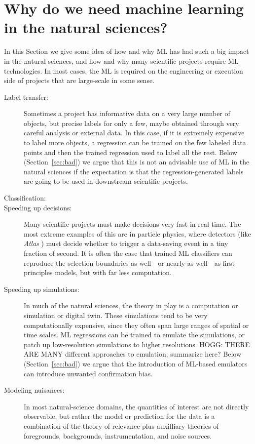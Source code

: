 \documentclass[11pt]{article}
\newcommand{\sectionname}{Section}
\begin{document}
\section{Why do we need machine learning in the natural sciences?}
In this \sectionname{} we give some idea of how and why ML has had such a big impact in the natural sciences, and how and why many scientific projects require ML technologies.
In most cases, the ML is required on the engineering or execution side of projects that are large-scale in some sense.
\begin{description}
  \item[Label transfer:] Sometimes a project has informative data on a very large number of objects, but precise labels for only a few, maybe obtained through very careful analysis or external data.
  In this case, if it is extremely expensive to label more objects, a regression can be trained on the few labeled data points and then the trained regression used to label all the rest.
  Below (\sectionname~\ref{sec:bad}) we argue that this is not an advisable use of ML in the natural sciences if the expectation is that the regression-generated labels are going to be used in downstream scientific projects.
  \item[Classification:] 
  \item[Speeding up decisions:] Many scientific projects must make decisions very fast in real time.
  The most extreme examples of this are in particle physics, where detectors (like \textsl{Atlas} \cite{atlas}) must decide whether to trigger a data-saving event in a tiny fraction of second.
  It is often the case that trained ML classifiers can reproduce the selection boundaries as well---or nearly as well---as first-principles models, but with far less computation.
  \item[Speeding up simulations:] In much of the natural sciences, the theory in play is a computation or simulation or digital twin.
  These simulations tend to be very computationally expensive, since they often span large ranges of spatial or time scales.
  ML regressions can be trained to emulate the simulations, or patch up low-resolution simulations to higher resolutions.
  HOGG: THERE ARE MANY different approaches to emulation; summarize here?
  Below (\sectionname~\ref{sec:bad}) we argue that the introduction of ML-based emulators can introduce unwanted confirmation bias.
  \item[Modeling nuisances:] In most natural-science domains, the quantities of interest are not directly observable, but rather the model or prediction for the data is a combination of the theory of relevance plus auxilliary theories of foregrounds, backgrounds, instrumentation, and noise sources.

\end{description}
\end{document}
